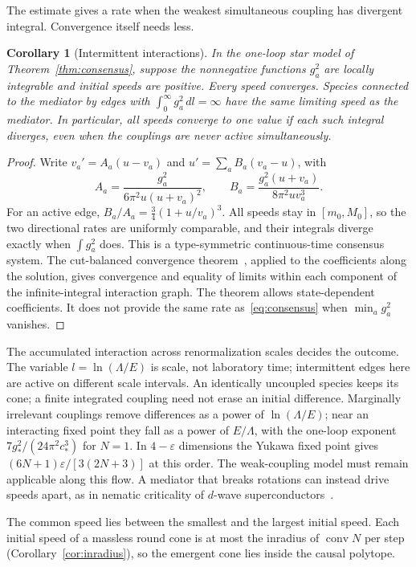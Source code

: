 \documentclass[12pt]{article}
\newtheorem{corollary}[theorem]{Corollary}
\theoremstyle{definition}
\theoremstyle{remark}
\newcommand{\conv}{\operatorname{conv}}
\begin{document}
The estimate gives a rate when the weakest simultaneous coupling has divergent integral. Convergence itself needs less.

\begin{corollary}[Intermittent interactions]
\label{cor:intermittent}
In the one-loop star model of Theorem~\ref{thm:consensus}, suppose the nonnegative functions $g_a^2$ are locally integrable and initial speeds are positive. Every speed converges. Species connected to the mediator by edges with $\int_0^\infty g_a^2\,dl=\infty$ have the same limiting speed as the mediator. In particular, all speeds converge to one value if each such integral diverges, even when the couplings are never active simultaneously.
\end{corollary}
\begin{proof}
Write $v_a'=A_a(u-v_a)$ and $u'=\sum_aB_a(v_a-u)$, with
\[
 A_a=\frac{g_a^2}{6\pi^2u(u+v_a)^2},\qquad
 B_a=\frac{g_a^2(u+v_a)}{8\pi^2u v_a^3}.
\]
For an active edge, $B_a/A_a=\tfrac34(1+u/v_a)^3$. All speeds stay in $[m_0,M_0]$, so the two directional rates are uniformly comparable, and their integrals diverge exactly when $\int g_a^2$ does. This is a type-symmetric continuous-time consensus system. The cut-balanced convergence theorem~\cite{HendrickxTsitsiklis2013}, applied to the coefficients along the solution, gives convergence and equality of limits within each component of the infinite-integral interaction graph. The theorem allows state-dependent coefficients. It does not provide the same rate as~\eqref{eq:consensus} when $\min_a g_a^2$ vanishes.
\end{proof}

The accumulated interaction across renormalization scales decides the outcome. The variable $l=\ln(\Lambda/E)$ is scale, not laboratory time; intermittent edges here are active on different scale intervals. An identically uncoupled species keeps its cone; a finite integrated coupling need not erase an initial difference. Marginally irrelevant couplings remove differences as a power of $\ln(\Lambda/E)$; near an interacting fixed point they fall as a power of $E/\Lambda$, with the one-loop exponent $7g_*^2/(24\pi^2c_*^3)$ for $N=1$. In $4-\varepsilon$ dimensions the Yukawa fixed point gives $(6N+1)\varepsilon/[3(2N+3)]$ at this order. The weak-coupling model must remain applicable along this flow. A mediator that breaks rotations can instead drive speeds apart, as in nematic criticality of $d$-wave superconductors~\cite{HuhSachdev2008}.

The common speed lies between the smallest and the largest initial speed. Each initial speed of a massless round cone is at most the inradius of $\conv N$ per step (Corollary~\ref{cor:inradius}), so the emergent cone lies inside the causal polytope.
\end{document}
